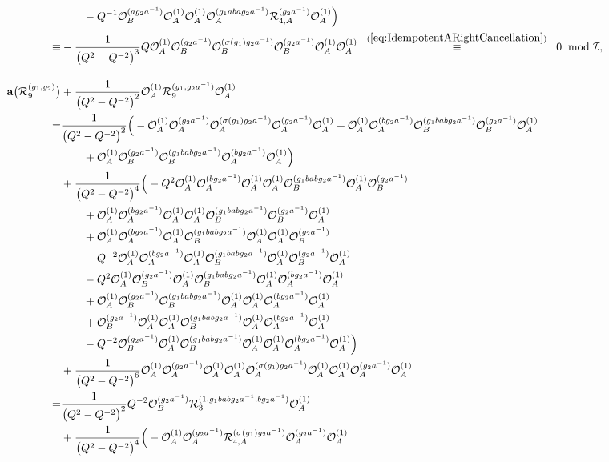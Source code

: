 \documentclass{amsart}
\newcommand{\Oa}{\mathcal O_A}
\newcommand{\Ob}{\mathcal O_B}
\newcommand{\R}{\mathcal R}
\begin{document}
\begin{align*}
&\qquad-Q^{-1}\Ob^{(ag_2a^{-1})}\Oa^{(1)}\Oa^{(1)}\Oa^{(g_1abag_2a^{-1})}\R_{4,A}^{(g_2a^{-1})}\Oa^{(1)}\Big)\\
\equiv&-\frac1{\big(Q^2-Q^{-2}\big)^3}Q\Oa^{(1)}\Ob^{(g_2a^{-1})}\Ob^{(\sigma(g_1)g_2a^{-1})}\Ob^{(g_2a^{-1})}\Oa^{(1)}\Oa^{(1)}\;\;\overset{(\ref{eq:IdempotentARightCancellation})}{\equiv}\;\;0\;\bmod\mathcal I,\\[1em]
\mathbf a\big(\R_{9}^{(g_1,g_2)}\big)&+\frac1{\big(Q^2-Q^{-2}\big)^2}\Oa^{(1)}\R_{9}^{(g_1,g_2a^{-1})}\Oa^{(1)}\\
=&\frac1{\big(Q^2-Q^{-2}\big)^2}\Big(-\Oa^{(1)}\Oa^{(g_2a^{-1})}\Oa^{(\sigma(g_1)g_2a^{-1})}\Oa^{(g_2a^{-1})}\Oa^{(1)}+\Oa^{(1)}\Oa^{(bg_2a^{-1})}\Ob^{(g_1babg_2a^{-1})}\Ob^{(g_2a^{-1})}\Oa^{(1)}\\
&\qquad+\Oa^{(1)}\Ob^{(g_2a^{-1})}\Ob^{(g_1babg_2a^{-1})}\Oa^{(bg_2a^{-1})}\Oa^{(1)}\Big)\\
&+\frac1{\big(Q^2-Q^{-2}\big)^4}\Big(-Q^2\Oa^{(1)}\Oa^{(bg_2a^{-1})}\Oa^{(1)}\Oa^{(1)}\Ob^{(g_1babg_2a^{-1})}\Oa^{(1)}\Ob^{(g_2a^{-1})}\\
&\qquad+\Oa^{(1)}\Oa^{(bg_2a^{-1})}\Oa^{(1)}\Oa^{(1)}\Ob^{(g_1babg_2a^{-1})}\Ob^{(g_2a^{-1})}\Oa^{(1)}\\
&\qquad+\Oa^{(1)}\Oa^{(bg_2a^{-1})}\Oa^{(1)}\Ob^{(g_1babg_2a^{-1})}\Oa^{(1)}\Oa^{(1)}\Ob^{(g_2a^{-1})}\\
&\qquad-Q^{-2}\Oa^{(1)}\Oa^{(bg_2a^{-1})}\Oa^{(1)}\Ob^{(g_1babg_2a^{-1})}\Oa^{(1)}\Ob^{(g_2a^{-1})}\Oa^{(1)}\\
&\qquad-Q^2\Oa^{(1)}\Ob^{(g_2a^{-1})}\Oa^{(1)}\Ob^{(g_1babg_2a^{-1})}\Oa^{(1)}\Oa^{(bg_2a^{-1})}\Oa^{(1)}\\
&\qquad+\Oa^{(1)}\Ob^{(g_2a^{-1})}\Ob^{(g_1babg_2a^{-1})}\Oa^{(1)}\Oa^{(1)}\Oa^{(bg_2a^{-1})}\Oa^{(1)}\\
&\qquad+\Ob^{(g_2a^{-1})}\Oa^{(1)}\Oa^{(1)}\Ob^{(g_1babg_2a^{-1})}\Oa^{(1)}\Oa^{(bg_2a^{-1})}\Oa^{(1)}\\
&\qquad-Q^{-2}\Ob^{(g_2a^{-1})}\Oa^{(1)}\Ob^{(g_1babg_2a^{-1})}\Oa^{(1)}\Oa^{(1)}\Oa^{(bg_2a^{-1})}\Oa^{(1)}\Big)\\
&+\frac1{\big(Q^2-Q^{-2}\big)^6}\Oa^{(1)}\Oa^{(g_2a^{-1})}\Oa^{(1)}\Oa^{(1)}\Oa^{(\sigma(g_1)g_2a^{-1})}\Oa^{(1)}\Oa^{(1)}\Oa^{(g_2a^{-1})}\Oa^{(1)}\\
=&\frac1{\big(Q^2-Q^{-2}\big)^2}Q^{-2}\Ob^{(g_2a^{-1})}\R_{3}^{(1,g_1babg_2a^{-1},bg_2a^{-1})}\Oa^{(1)}\\
&+\frac1{\big(Q^2-Q^{-2}\big)^4}\Big(-\Oa^{(1)}\Oa^{(g_2a^{-1})}\R_{4,A}^{(\sigma(g_1)g_2a^{-1})}\Oa^{(g_2a^{-1})}\Oa^{(1)}\\

\end{align*}
\end{document}
